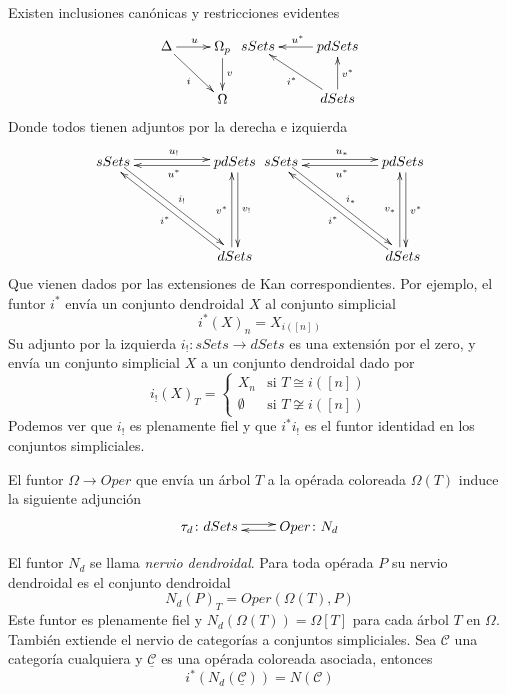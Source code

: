 \documentclass[11pt,a4paper,openright,oneside]{article}
\numberwithin{equation}{section}
\theoremstyle{definition}
\begin{document}
Existen inclusiones can\'onicas y restricciones evidentes
$$
    \xymatrix{
        \Delta \ar[rd]_{i} \ar[r]^u
        &\Omega_p \ar[d]^v\\
        &\Omega
    }
    \xymatrix{
    sSets
    &pdSets \ar[l]_{u^{*}} \\
    &dSets \ar[lu]^{i^{*}} \ar[u]_{v^{*}}
    }
$$
Donde todos tienen adjuntos por la derecha e izquierda
$$
    \xymatrix{
    sSets \ar@<0.5ex>[rr]^{u_{!}} \ar@<0.5ex>[rrdd]^{i_{!}}
    & & pdSets \ar@<0.5ex>[ll]^{u^{*}} \ar@<0.5ex>[dd]^{v_{!}} \\
    & & \\
    & &  dSets \ar@<0.5ex>[lluu]^{i^{*}} \ar@<0.5ex>[uu]^{v^{*}}
    }
    \xymatrix{
    sSets \ar@<0.5ex>[rr]^{u_{*}} \ar@<0.5ex>[rrdd]^{i_{*}}
    & & pdSets \ar@<0.5ex>[ll]^{u^{*}} \ar@<0.5ex>[dd]^{v^{*}} \\
    & & \\
    & & dSets \ar@<0.5ex>[lluu]^{i^{*}} \ar@<0.5ex>[uu]^{v_{*}}
    }
$$
Que vienen dados por las extensiones de Kan correspondientes. Por ejemplo, el funtor $i^{*}$ env\'ia un conjunto dendroidal $X$ al conjunto simplicial
$$
    i^{*}(X)_n = X_{i([n])}
$$
Su adjunto por la izquierda $i_{!}\colon sSets \to dSets$ es una extensi\'on por el zero, y env\'ia un conjunto simplicial $X$ a un conjunto dendroidal dado por
\[
    i_{!}(X)_T =
    \begin{cases}
        X_n       & \text{si } T\cong i([n])     \\
        \emptyset & \text{si } T\not\cong i([n])
    \end{cases}
\]
Podemos ver que $i_!$ es plenamente fiel y que $i^{*}i_{!}$ es el funtor identidad en los conjuntos simpliciales.

El funtor $\Omega \to Oper$ que env\'ia un \'arbol $T$ a la op\'erada coloreada $\Omega(T)$ induce la siguiente adjunci\'on
\[
    \xymatrix{
        \tau_d\colon dSets\ar@<0.5ex>[r] &  Oper\colon N_d \ar@<0.5ex>[l]
    }
\]

El funtor $N_d$ se llama \emph{nervio dendroidal}. Para toda op\'erada $P$ su nervio dendroidal es el conjunto dendroidal
$$
    N_d(P)_T = Oper(\Omega(T), P)
$$
Este funtor es plenamente fiel y $N_d(\Omega(T))=\Omega[T]$ para cada \'arbol $T$ en $\Omega$.
Tambi\'en extiende el nervio de categor\'ias a conjuntos simpliciales. Sea $\mathcal{C}$ una categor\'ia cualquiera y $\underline{\mathcal{C}}$ es una op\'erada coloreada asociada, entonces
$$
    i^{*}(N_d(\underline{\mathcal{C}})) = N(\mathcal{C})
$$
\end{document}
